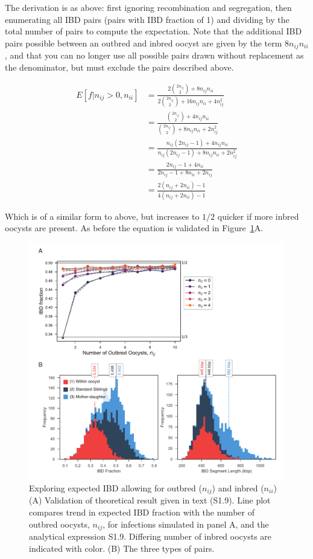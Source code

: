 \documentclass[9pt,lineno]{elife}
\begin{document}
The derivation is as above: first ignoring recombination and segregation, then enumerating all IBD pairs (pairs with IBD fraction of 1) and dividing by the total number of pairs to compute the expectation. Note that the additional IBD pairs possible between an outbred and inbred oocyst are given by the term $8n_{ij}n_{ii}$, and that you can no longer use all possible pairs drawn without replacement as the denominator, but must exclude the pairs described above.

\begin{align}
E[f|n_{ij} > 0, n_{ii}] & = \frac{2{2n_{ij} \choose 2} + 8n_{ij}n_{ii}}{2{2n_{ij} \choose 2} + 16n_{ij}n_{ii} + 4n_{ij}^2} \nonumber\\
& = \frac{{2n_{ij} \choose 2} + 4n_{ij}n_{ii}}{{2n_{ij} \choose 2} + 8n_{ij}n_{ii} + 2n_{ij}^2} \nonumber\\
& = \frac{n_{ij}(2n_{ij} - 1) + 4n_{ij}n_{ii}}{n_{ij}(2n_{ij} - 1) + 8n_{ij}n_{ii} + 2n_{ij}^2} \nonumber\\
& = \frac{2n_{ij} - 1 + 4n_{ii}}{2n_{ij} - 1 + 8n_{ii} + 2n_{ij}} \nonumber\\
& = \frac{2(n_{ij} + 2n_{ii}) - 1}{4(n_{ij} + 2n_{ii}) - 1}  \label{eq2}
\end{align}


Which is of a similar form to above, but increases to $1/2$ quicker if more inbred oocysts are present. As before the equation is validated in Figure~\ref{fig:validinbred}A.

\begin{figure}[ht]
  \centering{}
  \includegraphics[width = .85\textwidth]{supFigures/supp-Fig2.pdf}
  \caption{Exploring expected IBD allowing for outbred ($n_{ij}$) and inbred ($n_{ii}$) (A) Validation of theoretical result given in text (S1.9). Line plot compares trend in expected IBD fraction with the number of outbred oocysts, $n_{ij}$, for infections simulated in panel A, and the analytical expression S1.9. Differing number of inbred oocysts are indicated with color. (B) The three types of pairs. } \label{fig:validinbred}
\end{figure}
\end{document}
